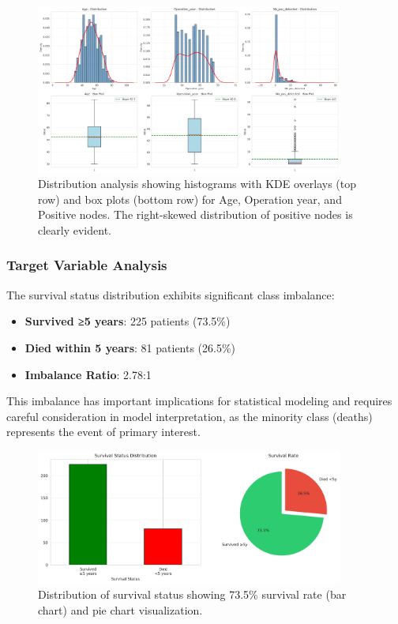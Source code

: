 \documentclass[12pt,a4paper]{article}
\begin{document}
\begin{figure}[H]
\centering
\includegraphics[width=0.9\textwidth]{univariate_distributions.png}
\caption{Distribution analysis showing histograms with KDE overlays (top row) and box plots (bottom row) for Age, Operation year, and Positive nodes. The right-skewed distribution of positive nodes is clearly evident.}
\label{fig:univariate_distributions}
\end{figure}

\subsubsection{Target Variable Analysis}

The survival status distribution exhibits significant class imbalance:

\begin{itemize}
    \item \textbf{Survived ≥5 years}: 225 patients (73.5\%)
    \item \textbf{Died within 5 years}: 81 patients (26.5\%)
    \item \textbf{Imbalance Ratio}: 2.78:1
\end{itemize}

This imbalance has important implications for statistical modeling and requires careful consideration in model interpretation, as the minority class (deaths) represents the event of primary interest.

\begin{figure}[H]
\centering
\includegraphics[width=0.9\textwidth]{survival_status_distribution.png}
\caption{Distribution of survival status showing 73.5\% survival rate (bar chart) and pie chart visualization.}
\label{fig:survival_distribution}
\end{figure}
\end{document}
